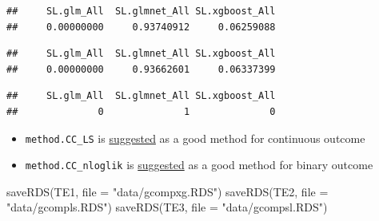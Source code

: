 \documentclass[
]{book}
\newenvironment{Shaded}{\begin{snugshade}}{\end{snugshade}}
\newcommand{\AttributeTok}[1]{\textcolor[rgb]{0.77,0.63,0.00}{#1}}
\newcommand{\FunctionTok}[1]{\textcolor[rgb]{0.00,0.00,0.00}{#1}}
\newcommand{\NormalTok}[1]{#1}
\newcommand{\OtherTok}[1]{\textcolor[rgb]{0.56,0.35,0.01}{#1}}
\newcommand{\SpecialCharTok}[1]{\textcolor[rgb]{0.00,0.00,0.00}{#1}}
\newcommand{\StringTok}[1]{\textcolor[rgb]{0.31,0.60,0.02}{#1}}
\providecommand{\tightlist}{%
  \setlength{\itemsep}{0pt}\setlength{\parskip}{0pt}}
\begin{document}
\begin{verbatim}
##     SL.glm_All  SL.glmnet_All SL.xgboost_All 
##     0.00000000     0.93740912     0.06259088
\end{verbatim}

\begin{Shaded}
\end{Shaded}

\begin{verbatim}
##     SL.glm_All  SL.glmnet_All SL.xgboost_All 
##     0.00000000     0.93662601     0.06337399
\end{verbatim}

\begin{Shaded}
\end{Shaded}

\begin{verbatim}
##     SL.glm_All  SL.glmnet_All SL.xgboost_All 
##              0              1              0
\end{verbatim}

\begin{itemize}
\tightlist
\item
  \texttt{method.CC\_LS} is \href{https://si.biostat.washington.edu/sites/default/files/modules/lab1_0.pdf}{suggested} as a good method for continuous outcome
\item
  \texttt{method.CC\_nloglik} is \href{https://si.biostat.washington.edu/sites/default/files/modules/lab1_0.pdf}{suggested} as a good method for binary outcome
\end{itemize}

\begin{Shaded}
\begin{Highlighting}[]
\FunctionTok{saveRDS}\NormalTok{(TE1, }\AttributeTok{file =} \StringTok{"data/gcompxg.RDS"}\NormalTok{)}
\FunctionTok{saveRDS}\NormalTok{(TE2, }\AttributeTok{file =} \StringTok{"data/gcompls.RDS"}\NormalTok{)}
\FunctionTok{saveRDS}\NormalTok{(TE3, }\AttributeTok{file =} \StringTok{"data/gcompsl.RDS"}\NormalTok{)}
\end{Highlighting}
\end{Shaded}
\end{document}
